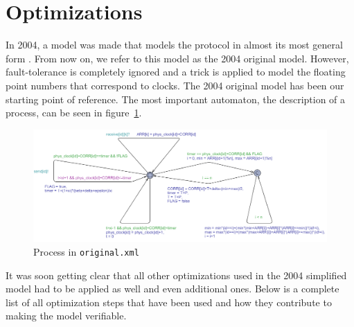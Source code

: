 \documentclass[a4paper,10pt]{article}
\newcommand{\oldorig}{2004 original model\xspace}
\newcommand{\oldsimple}{2004 simplified model\xspace}
\begin{document}
\section{Optimizations}

In 2004, a model was made that models the protocol in almost its most general form \cite{Aceto2004Notes}. From now on, we refer to this model as the \oldorig. However, fault-tolerance is completely ignored and a trick is applied to model the floating point numbers that correspond to clocks. The \oldorig has been our starting point of reference. The most important automaton, the description of a process, can be seen in figure~\ref{fig:original_process}.

\begin{figure}[!h]
\includegraphics[width=\textwidth]{original_process}
\caption{Process in \texttt{original.xml}\label{fig:original_process}}
\end{figure}

It was soon getting clear that all other optimizations used in the \oldsimple had to be applied as well and even additional ones. Below is a complete list of all optimization steps that have been used and how they contribute to making the model verifiable.
\end{document}
